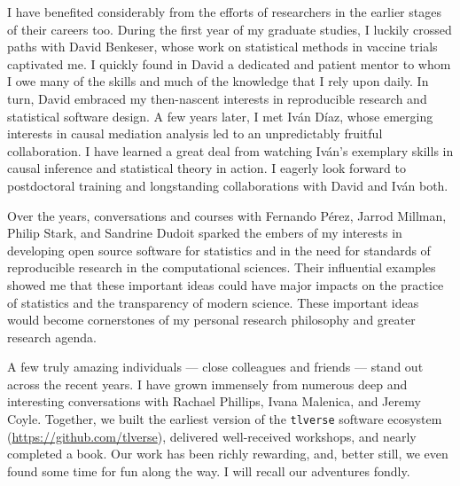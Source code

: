 \documentclass{ucbthesis}
\begin{document}
\begin{frontmatter}
\begin{acknowledgements}
I have benefited considerably from the efforts of researchers in the earlier
stages of their careers too. During the first year of my graduate studies,
I luckily crossed paths with David Benkeser, whose work on statistical methods
in vaccine trials captivated me. I quickly found in David a dedicated and
patient mentor to whom I owe many of the skills and much of the knowledge that
I rely upon daily. In turn, David embraced my then-nascent interests in
reproducible research and statistical software design.
A few years later, I met Iv\'{a}n D\'{i}az, whose emerging interests in causal
mediation analysis led to an unpredictably fruitful collaboration. I have
learned a great deal from watching Iv\'{a}n's exemplary skills in causal
inference and statistical theory in action.
I eagerly look forward to postdoctoral training and longstanding collaborations
with David and Iv\'{a}n both.

Over the years, conversations and courses with Fernando P{\'e}rez, Jarrod
Millman, Philip Stark, and Sandrine Dudoit sparked the embers of my interests in
developing open source software for statistics and in the need for standards of
reproducible research in the computational sciences. Their influential examples
showed me that these important ideas could have major impacts on the practice of
statistics and the transparency of modern science. These important ideas would
become cornerstones of my personal research philosophy and greater research
agenda.

A few truly amazing individuals --- close colleagues and friends --- stand out
across the recent years. I have grown immensely from numerous deep and
interesting conversations with Rachael Phillips, Ivana Malenica, and Jeremy
Coyle. Together, we built the earliest version of the \texttt{tlverse} software
ecosystem (\url{https://github.com/tlverse}), delivered well-received workshops,
and nearly completed a book. Our work has been richly rewarding, and,
better still, we even found some time for fun along the way. I will recall our
adventures fondly.

\end{acknowledgements}

\end{frontmatter}

\pagestyle{headings}








\printbibliography
\end{document}

